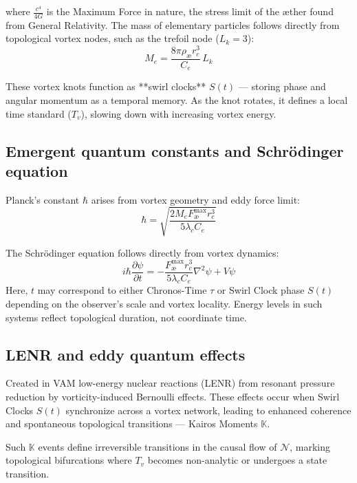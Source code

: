 where $\frac{c^4}{4G}$ is the Maximum Force in nature, the stress limit of the æther found from General Relativity.
The mass of elementary particles follows directly from topological vortex nodes, such as the trefoil node ($L_k=3$):
\begin{equation}
    M_e = \frac{8\pi \rho_\text{\ae} r_c^3}{C_e}\, L_k
\end{equation}

These vortex knots function as **swirl clocks** $S(t)$ — storing phase and angular momentum as a temporal memory. As the knot rotates, it defines a local time standard ($T_v$), slowing down with increasing vortex energy.


\subsection*{Emergent quantum constants and Schrödinger equation}

Planck's constant $\hbar$ arises from vortex geometry and eddy force limit:
\begin{equation}
    \hbar = \sqrt{\frac{2 M_e F^{\text{max}}_{\text{\ae}} r_c^3}{5 \lambda_c C_e}}
\end{equation}

The Schrödinger equation follows directly from vortex dynamics:
\begin{equation}
    i \hbar \frac{\partial \psi}{\partial t} = -\frac{F^{\text{max}}_{\text{\ae}} r_c^3}{5 \lambda_c C_e}\nabla^2 \psi + V\psi
\end{equation}
Here, $t$ may correspond to either Chronos-Time $\tau$ or Swirl Clock phase $S(t)$ depending on the observer's scale and vortex locality. Energy levels in such systems reflect topological duration, not coordinate time.


\subsection*{LENR and eddy quantum effects}

Created in VAM low-energy nuclear reactions (LENR) from resonant pressure reduction by vorticity-induced Bernoulli effects. These effects occur when Swirl Clocks $S(t)$ synchronize across a vortex network, leading to enhanced coherence and spontaneous topological transitions — Kairos Moments $\mathbb{K}$.

Such $\mathbb{K}$ events define irreversible transitions in the causal flow of $\mathcal{N}$, marking topological bifurcations where $T_v$ becomes non-analytic or undergoes a state transition.

